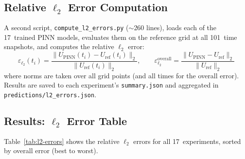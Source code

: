 \documentclass[11pt,a4paper]{article}
\begin{document}
\subsection{Relative $\ell_2$ Error Computation}

A second script, \texttt{compute\_l2\_errors.py} ($\sim$260 lines),
loads each of the 17~trained PINN models, evaluates them on the
reference grid at all 101~time snapshots, and computes the relative
$\ell_2$ error:
\begin{equation}
  \varepsilon_{\ell_2}(t_i)
  = \frac{\| U_{\text{PINN}}(t_i) - U_{\text{ref}}(t_i) \|_2}
         {\| U_{\text{ref}}(t_i) \|_2},
  \qquad
  \varepsilon_{\ell_2}^{\text{overall}}
  = \frac{\| U_{\text{PINN}} - U_{\text{ref}} \|_2}
         {\| U_{\text{ref}} \|_2}
  \label{eq:l2-error}
\end{equation}
where norms are taken over all grid points (and all times for the
overall error).  Results are saved to each experiment's
\texttt{summary.json} and aggregated in
\texttt{predictions/l2\_errors.json}.


\subsection{Results: $\ell_2$ Error Table}
\label{sec:l2-table}

Table~\ref{tab:l2-errors} shows the relative $\ell_2$ errors for all
17~experiments, sorted by overall error (best to worst).
\end{document}
